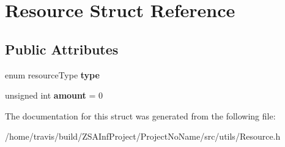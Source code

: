 \hypertarget{structResource}{\section{Resource Struct Reference}
\label{structResource}
}
\subsection*{Public Attributes}
\begin{DoxyCompactItemize}
\item 
\hypertarget{structResource_a6f6d74c92f84c94a53eed2f97482ec21}{enum resource\-Type {\bfseries type}}\label{structResource_a6f6d74c92f84c94a53eed2f97482ec21}

\item 
\hypertarget{structResource_a4cdadc319126c34712bd187810389386}{unsigned int {\bfseries amount} = 0}\label{structResource_a4cdadc319126c34712bd187810389386}

\end{DoxyCompactItemize}


The documentation for this struct was generated from the following file\-:\begin{DoxyCompactItemize}
\item 
/home/travis/build/\-Z\-S\-A\-Inf\-Project/\-Project\-No\-Name/src/utils/Resource.\-h\end{DoxyCompactItemize}

